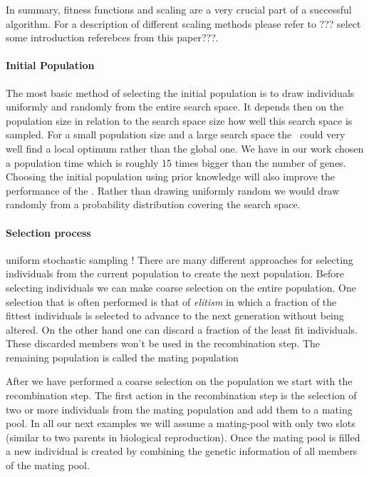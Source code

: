 In summary, fitness functions and scaling are a very crucial part of a successful algorithm. For a description of different scaling methods please refer to \citet{Kreinovich93geneticalgorithms} ??? select some introduction referebces from this paper???.

\paragraph{Initial Population}
The most basic method of selecting the initial population is to draw individuals uniformly and randomly from the entire search space. It depends then on the population size in relation to the search space size how well this search space is sampled. For a small population size and a large search space the \ga\ could very well find a local optimum rather than the global one. We have in our work chosen a population time which is roughly 15 times bigger than the number of genes. Choosing the initial population using prior knowledge will also improve the performance of the \ga. Rather than drawing uniformly random we would draw randomly from a probability distribution covering the search space. 

\paragraph{Selection process}
uniform stochastic sampling !
There are many different approaches for selecting individuals from the current population to create the next population. Before selecting individuals we can make coarse selection on the entire population. One selection that is often performed is that of \textit{elitism} in which a fraction of the fittest individuals is selected to advance to the next generation without being altered. On the other hand one can discard a fraction of the least fit individuals. These discarded members won't be used in the recombination step. The remaining population is called the mating population

After we have performed a coarse selection on the population we start with the recombination step. The first action in the recombination step is the selection of two or more individuals from the mating population and add them to a mating pool. In all our next examples we will assume a mating-pool with only two slots (similar to two parents in biological reproduction). Once the mating pool is filled a new individual is created by combining the genetic information of all members of the mating pool. 

